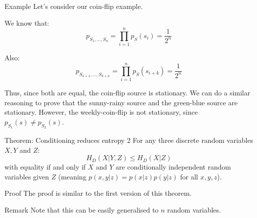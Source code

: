 \documentclass[a4paper]{article}
\begin{document}
\begin{parag}{Example}
    Let's consider our coin-flip example.

    We know that: 
    \[p_{S_1, \ldots, S_n} = \prod_{i=1}^{n} p_{S}\left(s_i\right) = \frac{1}{2^n}\]
    
    Also: 
    \[p_{S_{k+1}, \ldots, S_{k+n}} = \prod_{i=1}^{n} p_{S}\left(s_{i+k}\right) = \frac{1}{2^n}\]

    Thus, since both are equal, the coin-flip source is stationary. We can do a similar reasoning to prove that the sunny-rainy source and the green-blue source are stationary.  However, the weekly-coin-flip is not stationary, since $p_{S_1}\left(s\right) \neq p_{S_2}\left(s\right)$.
\end{parag}

\begin{parag}{Theorem: Conditioning reduces entropy 2}
    For any three discrete random variables $X, Y$ and $Z$: 
    \[H_D\left(X|Y, Z\right) \leq H_D\left(X | Z\right)\]
    with equality if and only if $X$ and $Y$ are conditionally independent random variables given $Z$ (meaning $p\left(x, y|z\right) = p\left(x|z\right)p\left(y|z\right)$ for all $x, y, z$).

    \begin{subparag}{Proof}
        The proof is similar to the first version of this theorem.
    \end{subparag}

    \begin{subparag}{Remark}
        Note that this can be easily generalised to $n$ random variables.
    \end{subparag}
\end{parag}
\end{document}
